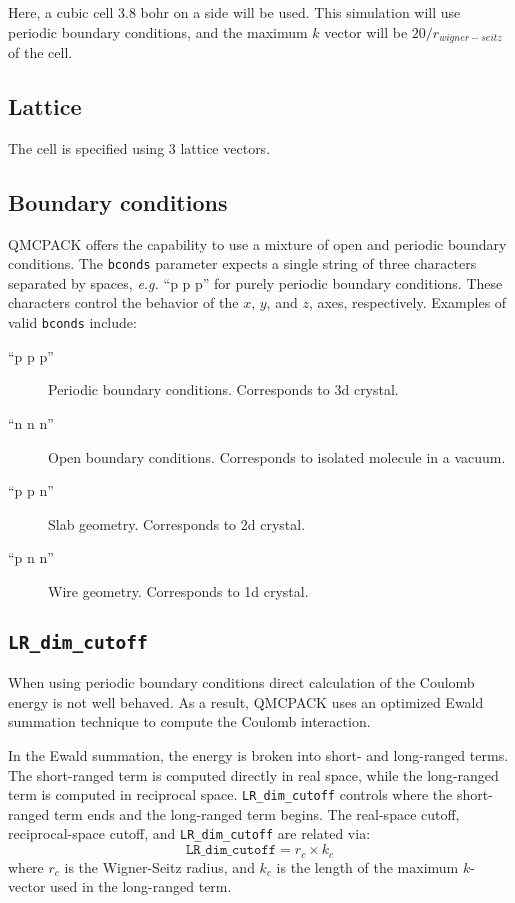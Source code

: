 Here, a cubic cell 3.8 bohr on a side will be used.
This simulation will use periodic boundary conditions, and the maximum
$k$ vector will be $20/r_{wigner-seitz}$ of the cell.


\subsection{Lattice}
The cell is specified using 3 lattice vectors.


\subsection{Boundary conditions}
QMCPACK offers the capability to use a mixture of open and periodic boundary conditions.
The \texttt{bconds} parameter expects a single string of three characters separated by
spaces, \textit{e.g.} ``p p p'' for purely periodic boundary conditions. These characters control
the behavior of the $x$, $y$, and $z$, axes, respectively.
Examples of valid \texttt{bconds} include:

\begin{description}
\item[``p p p''] Periodic boundary conditions. Corresponds to 3d crystal.
\item[``n n n''] Open boundary conditions. Corresponds to isolated molecule in a vacuum.
\item[``p p n''] Slab geometry. Corresponds to 2d crystal.
\item[``p n n''] Wire geometry. Corresponds to 1d crystal.
\end{description}


\subsection{\texttt{LR\_dim\_cutoff}}
When using periodic boundary conditions direct calculation of the Coulomb energy is
not well behaved. As a result, QMCPACK uses an optimized Ewald summation technique
to compute the Coulomb interaction. %

In the Ewald summation, the energy is broken into short- and long-ranged terms.
The short-ranged term is computed directly in real space, while the long-ranged term is computed in reciprocal space.
\texttt{LR\_dim\_cutoff} controls where the short-ranged term ends and the long-ranged term begins.
The real-space cutoff, reciprocal-space cutoff, and \texttt{LR\_dim\_cutoff} are related via:
\[
\texttt{LR\_dim\_cutoff} = r_{c} \times k_{c}
\]
where $r_{c}$ is the Wigner-Seitz radius, and $k_{c}$ is the length of the maximum $k$-vector used in the long-ranged term.
